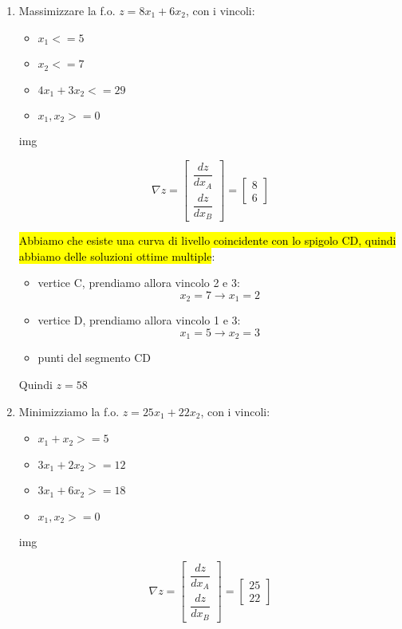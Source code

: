 \begin{enumerate}
	\item Massimizzare la f.o. $z = 8x_1 + 6x_2$, con i vincoli:
		\begin{itemize}
			\item $x_1 <= 5$
			\item $x_2 <= 7$
			\item $4x_1 + 3x_2 <= 29$
			\item $x_1, x_2 >= 0$
		\end{itemize}
		
		img
		
		$$\nabla z = \left[\begin{array}{c}
			\dfrac{dz}{dx_A}\\
			\dfrac{dz}{dx_B}
		\end{array}\right] = \left[\begin{array}{c}
			8\\
			6
		\end{array}\right]
		$$
		
		\hl{Abbiamo che esiste una curva di livello coincidente con lo spigolo CD, quindi abbiamo delle soluzioni ottime multiple}:
		\begin{itemize}
			\item vertice C, prendiamo allora vincolo 2 e 3:
				$$x_2 = 7 \to x_1 = 2$$
			
			\item vertice D, prendiamo allora vincolo 1 e 3:
				$$x_1 = 5 \to x_2 = 3$$
		
			\item punti del segmento CD
		\end{itemize}
		
		Quindi $z = 58$
	
	
	\item Minimizziamo la f.o. $z = 25x_1 + 22x_2$, con i vincoli:
		\begin{itemize}
			\item $x_1 + x_2 >= 5$
			\item $3x_1 + 2x_2 >= 12$
			\item $3x_1 + 6x_2 >= 18$
			\item $x_1, x_2 >= 0$
		\end{itemize}
		
		img
		
		$$\nabla z = \left[\begin{array}{c}
			\dfrac{dz}{dx_A}\\
			\dfrac{dz}{dx_B}
		\end{array}\right] = \left[\begin{array}{c}
			25\\
			22
		\end{array}\right]
		$$
		

\end{enumerate}

